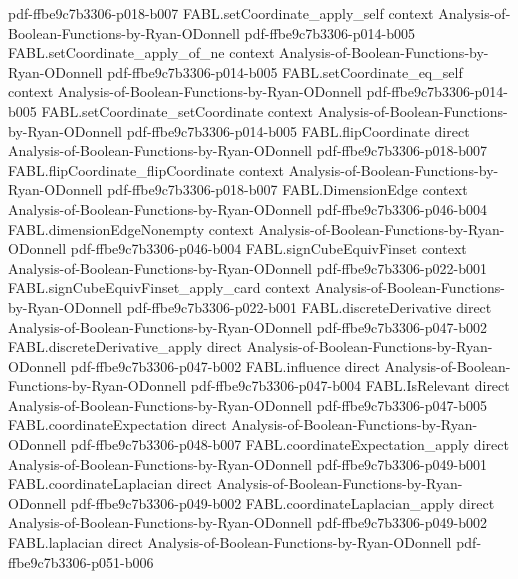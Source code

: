 \begin{theorem}
{    pdf-ffbe9c7b3306-p018-b007}
\proofstep
  {FABL.setCoordinate_apply_self}
  {context}
  {Analysis-of-Boolean-Functions-by-Ryan-ODonnell}
  {pdf-ffbe9c7b3306-p014-b005}
\proofstep
  {FABL.setCoordinate_apply_of_ne}
  {context}
  {Analysis-of-Boolean-Functions-by-Ryan-ODonnell}
  {pdf-ffbe9c7b3306-p014-b005}
\proofstep
  {FABL.setCoordinate_eq_self}
  {context}
  {Analysis-of-Boolean-Functions-by-Ryan-ODonnell}
  {pdf-ffbe9c7b3306-p014-b005}
\proofstep
  {FABL.setCoordinate_setCoordinate}
  {context}
  {Analysis-of-Boolean-Functions-by-Ryan-ODonnell}
  {pdf-ffbe9c7b3306-p014-b005}
\proofstep
  {FABL.flipCoordinate}
  {direct}
  {Analysis-of-Boolean-Functions-by-Ryan-ODonnell}
  {pdf-ffbe9c7b3306-p018-b007}
\proofstep
  {FABL.flipCoordinate_flipCoordinate}
  {context}
  {Analysis-of-Boolean-Functions-by-Ryan-ODonnell}
  {pdf-ffbe9c7b3306-p018-b007}
\proofstep
  {FABL.DimensionEdge}
  {context}
  {Analysis-of-Boolean-Functions-by-Ryan-ODonnell}
  {pdf-ffbe9c7b3306-p046-b004}
\proofstep
  {FABL.dimensionEdgeNonempty}
  {context}
  {Analysis-of-Boolean-Functions-by-Ryan-ODonnell}
  {pdf-ffbe9c7b3306-p046-b004}
\proofstep
  {FABL.signCubeEquivFinset}
  {context}
  {Analysis-of-Boolean-Functions-by-Ryan-ODonnell}
  {pdf-ffbe9c7b3306-p022-b001}
\proofstep
  {FABL.signCubeEquivFinset_apply_card}
  {context}
  {Analysis-of-Boolean-Functions-by-Ryan-ODonnell}
  {pdf-ffbe9c7b3306-p022-b001}
\proofstep
  {FABL.discreteDerivative}
  {direct}
  {Analysis-of-Boolean-Functions-by-Ryan-ODonnell}
  {pdf-ffbe9c7b3306-p047-b002}
\proofstep
  {FABL.discreteDerivative_apply}
  {direct}
  {Analysis-of-Boolean-Functions-by-Ryan-ODonnell}
  {pdf-ffbe9c7b3306-p047-b002}
\proofstep
  {FABL.influence}
  {direct}
  {Analysis-of-Boolean-Functions-by-Ryan-ODonnell}
  {pdf-ffbe9c7b3306-p047-b004}
\proofstep
  {FABL.IsRelevant}
  {direct}
  {Analysis-of-Boolean-Functions-by-Ryan-ODonnell}
  {pdf-ffbe9c7b3306-p047-b005}
\proofstep
  {FABL.coordinateExpectation}
  {direct}
  {Analysis-of-Boolean-Functions-by-Ryan-ODonnell}
  {pdf-ffbe9c7b3306-p048-b007}
\proofstep
  {FABL.coordinateExpectation_apply}
  {direct}
  {Analysis-of-Boolean-Functions-by-Ryan-ODonnell}
  {pdf-ffbe9c7b3306-p049-b001}
\proofstep
  {FABL.coordinateLaplacian}
  {direct}
  {Analysis-of-Boolean-Functions-by-Ryan-ODonnell}
  {pdf-ffbe9c7b3306-p049-b002}
\proofstep
  {FABL.coordinateLaplacian_apply}
  {direct}
  {Analysis-of-Boolean-Functions-by-Ryan-ODonnell}
  {pdf-ffbe9c7b3306-p049-b002}
\proofstep
  {FABL.laplacian}
  {direct}
  {Analysis-of-Boolean-Functions-by-Ryan-ODonnell}
  {pdf-ffbe9c7b3306-p051-b006}
\proofstep

\end{theorem}
